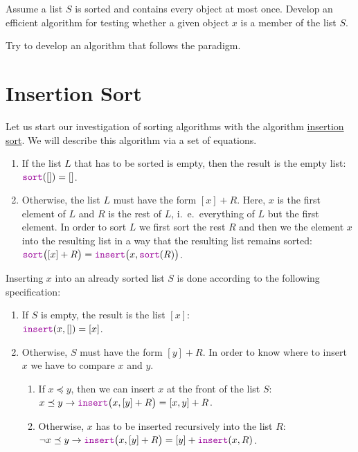 \exercise
Assume a list $S$ is sorted and contains every object at most once.  Develop an efficient
algorithm for testing whether a given object $x$ is a member of the list $S$.

\hint Try to develop an algorithm that follows the 
paradigm. 
\eoxs

\section{Insertion Sort \label{sec:insertionSort}}
Let us start our investigation of sorting algorithms with the algorithm
\href{http://en.wikipedia.org/wiki/Insertion_sort}{insertion sort}.
We will describe this algorithm via a set of equations.
\begin{enumerate}
\item If the list $L$ that has to be sorted is empty, then the result is the empty list: 
      \\[0.2cm]
      \hspace*{1.3cm}
      $\mytt{sort}([]) = []$.
\item Otherwise, the list $L$ must have the form $[x] + R$. Here, $x$ is the first element of $L$
      and $R$ is the rest of $L$, i.~e.~everything of $L$ but the first element.  In order to sort
      $L$ we first sort the rest $R$ and then we  the element $x$ into the resulting list in a
      way that the resulting list remains sorted:
      \\[0.2cm]
      \hspace*{1.3cm} $\mytt{sort}\bigl([x] + R\bigr) = \mytt{insert}\bigl(x, \mytt{sort}(R)\bigr)$.
\end{enumerate}
Inserting $x$ into an already sorted list $S$ is done according to the following specification:
\begin{enumerate}
\item If $S$ is empty, the result is the list $[x]$: \\[0.2cm]
      \hspace*{1.3cm}
      $\mytt{insert}(x,[]) = [x]$.
\item Otherwise, $S$ must have the form $[y] + R$.  In order to know where to insert $x$ we have to
      compare $x$ and $y$.
      \begin{enumerate}
      \item If $x \preceq y$, then we can insert $x$ at the front of the list $S$: \\[0.2cm]
            \hspace*{1.3cm}
            $x \preceq y \rightarrow \mytt{insert}\bigl(x, [y] + R\bigr) = [x,y] + R$. 
      \item Otherwise, $x$ has to be inserted recursively into the list $R$: \\[0.2cm]
            \hspace*{1.3cm}
            $\neg x \preceq y \rightarrow \mytt{insert}\bigl(x, [y] + R\bigr) = [y] + \mytt{insert}(x,R)$. 
      \end{enumerate}
\end{enumerate}

